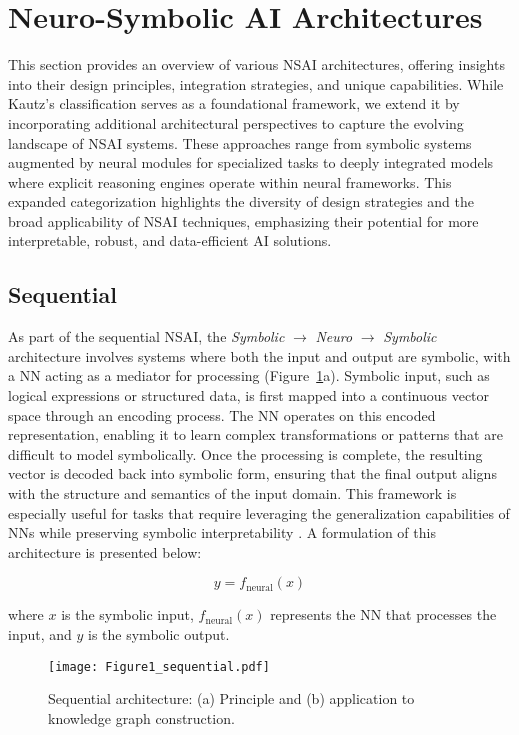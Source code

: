 \documentclass[12pt]{article}
\begin{document}
\section{Neuro-Symbolic AI Architectures}
This section provides an overview of various NSAI architectures, offering insights into their design principles, integration strategies, and unique capabilities. While Kautz’s classification \cite{kautz2022third} serves as a foundational framework, we extend it by incorporating additional architectural perspectives to capture the evolving landscape of NSAI systems. These approaches range from symbolic systems augmented by neural modules for specialized tasks to deeply integrated models where explicit reasoning engines operate within neural frameworks. This expanded categorization highlights the diversity of design strategies and the broad applicability of NSAI techniques, emphasizing their potential for more interpretable, robust, and data-efficient AI solutions.

\subsection{Sequential}
As part of the sequential NSAI, the \textit{Symbolic} $\to$ \textit{Neuro} $\to$ \textit{Symbolic} architecture involves systems where both the input and output are symbolic, with a NN acting as a mediator for processing (Figure~\ref{fig:sequential}a). Symbolic input, such as logical expressions or structured data, is first mapped into a continuous vector space through an encoding process. The NN operates on this encoded representation, enabling it to learn complex transformations or patterns that are difficult to model symbolically. Once the processing is complete, the resulting vector is decoded back into symbolic form, ensuring that the final output aligns with the structure and semantics of the input domain. This framework is especially useful for tasks that require leveraging the generalization capabilities of NNs while preserving symbolic interpretability \cite{lample2019deep, dimassi2021ontology}. A formulation of this architecture is presented below:

\begin{equation}
y = f_\text{neural}(x)   
\end{equation}

\noindent where $x$ is the symbolic input, $f_\text{neural}(x)$ represents the NN that processes the input, and $y$ is the symbolic output. 

\begin{figure}[h!]
    \centering
    \texttt{[image: Figure1\_sequential.pdf]}
    \caption{Sequential architecture: (a) Principle and (b) application to knowledge graph construction.}
    \label{fig:sequential}
\end{figure}
\end{document}
